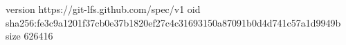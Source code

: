 version https://git-lfs.github.com/spec/v1
oid sha256:fe3c9a1201f37cb0e37b1820ef27c4c31693150a87091b0d4d741c57a1d9949b
size 626416
